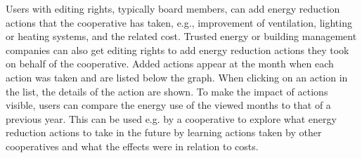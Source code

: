 %
Users with editing rights, typically board members, can  add energy reduction actions that the cooperative has taken, e.g., improvement of ventilation, lighting or heating systems, 
and the related cost.
Trusted energy or building management companies can also get editing rights to add energy reduction actions they took on behalf of the cooperative. 
Added actions appear at the month when each action was taken and are listed below the graph. When clicking on an action in the list, the details of the action are shown.
% 
To make the impact of actions visible, users can compare the energy use of the viewed months to that of a previous year. This can be used e.g. by a cooperative to explore what energy reduction actions to take in the future by learning actions taken by other cooperatives and what the effects were in relation to costs.



